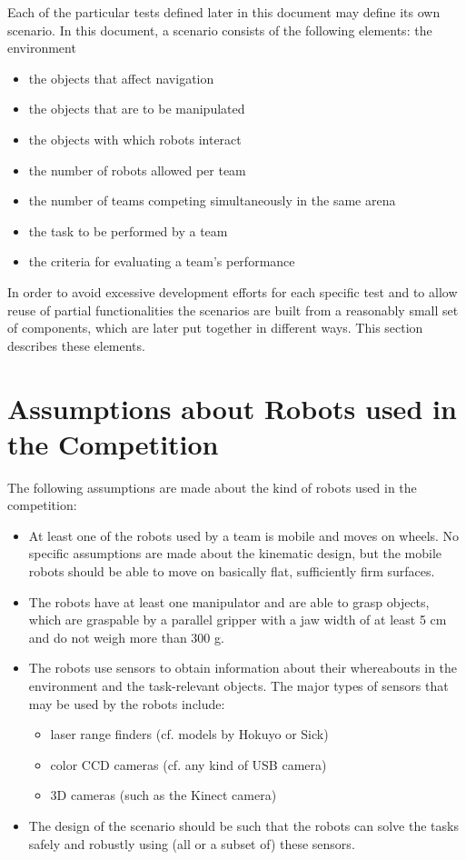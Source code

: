 Each of the particular tests defined later in this document may define its own scenario. In this document, a scenario consists of the following elements: 
the environment

\begin{itemize}
	\item the objects that affect navigation
	\item the objects that are to be manipulated
	\item the objects with which robots interact
	\item the number of robots allowed per team
	\item the number of teams competing simultaneously in the same arena
	\item the task to be performed by a team
	\item the criteria for evaluating a team’s performance
\end{itemize}

In order to avoid excessive development efforts for each specific test and to allow reuse of partial functionalities the scenarios are built from a reasonably small set of components, which are later put together in different ways. This section describes these elements.

\section{Assumptions about Robots used in the Competition}

The following assumptions are made about the kind of robots used in the competition:

\begin{itemize}

	\item At least one of the robots used by a team is mobile and moves on wheels. No specific assumptions are made about the kinematic design, but the mobile robots should be able to move on basically flat, sufficiently firm surfaces. 
	\item The robots have at least one manipulator and are able to grasp objects, which are graspable by a parallel gripper with a jaw width of at least 5 cm and do not weigh more than 300 g.
	\item The robots use sensors to obtain information about their whereabouts in the environment and the task-relevant objects. The major types of sensors that may be used by the robots include:
	\begin{itemize}
		\item laser range finders (cf. models by Hokuyo or Sick)
		\item color CCD cameras (cf. any kind of USB camera)
		\item 3D cameras (such as the Kinect camera)
	\end{itemize}
	
	\item The design of the scenario should be such that the robots can solve the 	tasks safely and robustly using (all or a subset of) these sensors.

\end{itemize}



